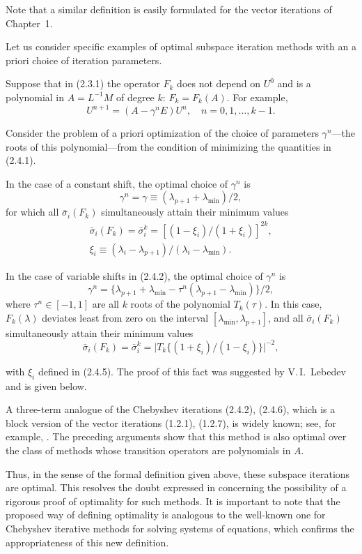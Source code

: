 \documentclass[11pt,oneside]{book}
\begin{document}
Note that a similar definition is easily formulated for the vector iterations of Chapter~1.

Let us consider specific examples of optimal subspace iteration methods with an a priori choice of iteration parameters.

Suppose that in (2.3.1) the operator $F_k$ does not depend on $U^0$ and is a polynomial in $A = L^{-1}M$ of degree $k$: $F_k = F_k(A)$. For example,
\[
U^{n+1} = (A - \gamma^n E) U^n, \quad n = 0, 1, \ldots, k - 1. \tag{2.4.2}
\]

Consider the problem of a priori optimization of the choice of parameters $\gamma^n$---the roots of this polynomial---from the condition of minimizing the quantities in (2.4.1).

In the case of a constant shift, the optimal choice of $\gamma^n$ is
\[
\gamma^n = \gamma \equiv (\lambda_{p+1} + \lambda_{\min}) / 2, \tag{2.4.3}
\]
for which all $\bar{\sigma}_i(F_k)$ simultaneously attain their minimum values
\begin{gather*}
\bar{\sigma}_i(F_k) = \bar{\sigma}_i^k = [(1 - \xi_i) / (1 + \xi_i)]^{2k}, \tag{2.4.4} \\
\xi_i \equiv (\lambda_i - \lambda_{p+1}) / (\lambda_i - \lambda_{\min}). \tag{2.4.5}
\end{gather*}

In the case of variable shifts in (2.4.2), the optimal choice of $\gamma^n$ is
\[
\gamma^n = \{\lambda_{p+1} + \lambda_{\min} - \tau^n (\lambda_{p+1} - \lambda_{\min})\} / 2, \tag{2.4.6}
\]
where $\tau^n \in [-1, 1]$ are all $k$ roots of the polynomial $T_k(\tau)$. In this case, $F_k(\lambda)$ deviates least from zero on the interval $[\lambda_{\min}, \lambda_{p+1}]$, and all $\bar{\sigma}_i(F_k)$ simultaneously attain their minimum values
\[
\bar{\sigma}_i(F_k) = \bar{\sigma}_i^k = \bigl|T_k\{(1 + \xi_i) / (1 - \xi_i)\}\bigr|^{-2}, \tag{2.4.7}
\]

with $\xi_i$ defined in (2.4.5). The proof of this fact was suggested by V.\,I.~Lebedev \citep{KnyazevLebedev1983} and is given below.

A three-term analogue of the Chebyshev iterations (2.4.2), (2.4.6), which is a block version of the vector iterations (1.2.1), (1.2.7), is widely known; see, for example, \citep{Rutishauser1969,WilkinsonReinsch1976ru,Parlett1983}. The preceding arguments show that this method is also optimal over the class of methods whose transition operators are polynomials in $A$.

Thus, in the sense of the formal definition given above, these subspace iterations are optimal. This resolves the doubt expressed in \citep{Parlett1983} concerning the possibility of a rigorous proof of optimality for such methods. It is important to note that the proposed way of defining optimality is analogous to the well-known one for Chebyshev iterative methods for solving systems of equations, which confirms the appropriateness of this new definition.
\end{document}
